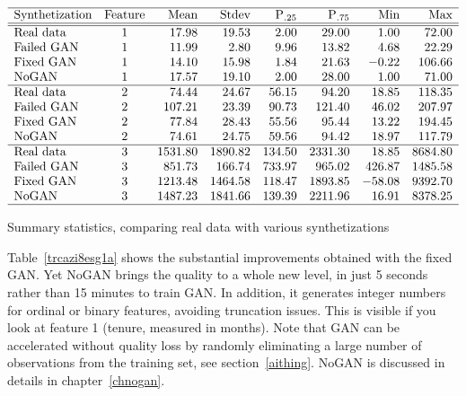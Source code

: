 \documentclass[oneside,10pt]{book}
\renewcommand{\arraystretch}{1.4} %
\begin{document}
\begin{table}[H]
\small
\[
\begin{array}{lcrrrrrr}
\hline
\text{Synthetization}	&  \text{Feature} & \text{Mean} & \text{Stdev} & \text{P$_{.25}$} & \text{P$_{.75}$} & \text{Min} & \text{Max}\\ 
\hline
\hline
 \text{Real data} &  1  &  17.98 &	19.53	&2.00	&29.00&	1.00	&72.00 \\
\text{Failed GAN} &  1 &11.99&	2.80&	9.96&	13.82&	4.68&	22.29\\
\text{Fixed GAN} &  1  &  14.10&	15.98&	1.84&	21.63&	-0.22&	106.66 \\
\text{NoGAN} &  1      &  17.57 &	19.10&	2.00&	28.00&	1.00&	71.00 \\
\hline
\text{Real data} &  2  &  74.44&	24.67&	56.15&	94.20&	18.85&	118.35 \\
\text{Failed GAN} &  2 &107.21&	23.39&	90.73&	121.40&	46.02&	207.97\\
\text{Fixed GAN} &  2  & 77.84&	28.43&	55.56&	95.44&	13.22&	194.45\\
\text{NoGAN} &  2      &  74.61&	24.75&	59.56&	94.42&	18.97&	117.79 \\
\hline
\text{Real data} &  3& 1531.80&	1890.82&	134.50&	2331.30&	18.85&	8684.80 \\
\text{Failed GAN} &  3 &851.73&	166.74&	733.97&	965.02&	426.87&	1485.58\\
\text{Fixed GAN} &  3      &  1213.48&	1464.58&	118.47&	1893.85&	-58.08&	9392.70 \\
\text{NoGAN} &  3  & 1487.23&	1841.66&	139.39&	2211.96&	16.91&	8378.25\\
\hline
\end{array}
\]
\caption{\label{trcazi8esg1a} Summary statistics, comparing real data with various synthetizations}
\end{table}

Table~\ref{trcazi8esg1a} shows the substantial improvements obtained with the fixed GAN. Yet NoGAN brings the quality to
 a whole new level, in just 5 seconds rather than 15 minutes to train GAN. In addition, it generates integer numbers for ordinal or binary features, avoiding truncation issues. This is visible if you look at feature 1 (tenure, measured in months). Note that GAN can be accelerated without quality loss by randomly eliminating
 a large number of observations from the training set, see section~\ref{aithing}. NoGAN is discussed in details in chapter~\ref{chnogan}. 
\end{document}
